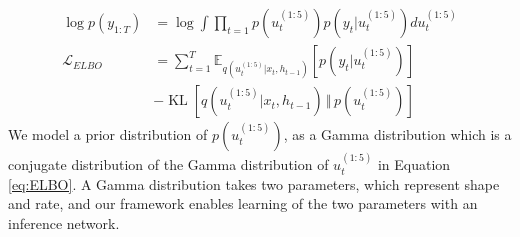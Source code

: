 \documentclass[letterpaper]{article} %
\DeclareMathOperator*{\KL}{KL}
\newcommand{\E}{\mathbb{E}}
\begin{document}
\begin{align}
\log{p}(y_{1:T}) &= \log \int \prod_{t=1}p(u_{t}^{(1:5)})p(y_{t}|u_{t}^{(1:5)})du_{t}^{(1:5)}
\label{eq:log_marginal_likelihood}\\
%
\mathcal{L}_{ELBO} &= \sum_{t=1}^{T}\E_{q(u_{t}^{(1:5)}|x_{t},h_{t-1})}[p(y_{t}|u_{t}^{(1:5)})] \nonumber \\
&- \KL[q(u_{t}^{(1:5)}|x_{t},h_{t-1}) \, \Vert \, p(u_{t}^{(1:5)})] \label{eq:ELBO}
\end{align}
We model a prior distribution of $p(u_{t}^{(1:5)})$, as a Gamma distribution which is a conjugate distribution of the Gamma distribution of $u_{t}^{(1:5)}$ in Equation \ref{eq:ELBO}. A Gamma distribution takes two parameters, which represent shape and rate, and our framework enables learning of the two parameters with an inference network.
\end{document}
